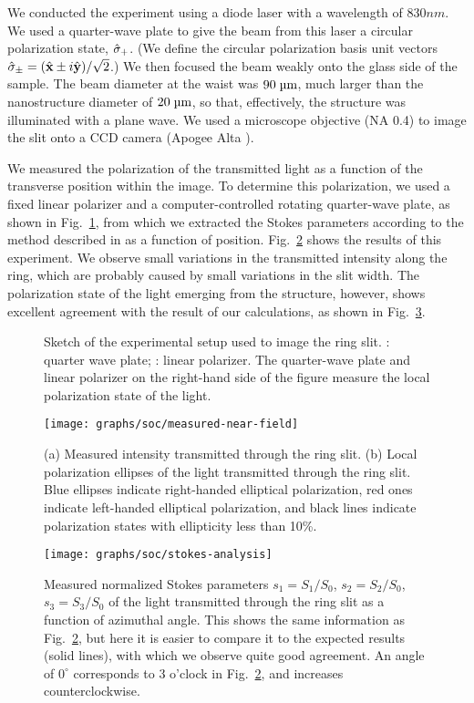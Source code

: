 We conducted the experiment using a diode laser with a wavelength of $830\unit{nm}$. We used a quarter-wave plate to give the beam from this laser a circular polarization state, $\hat{\mathbf{\sigma}}_{+}$. (We define the circular polarization basis unit vectors $\hat{\mathbf{\sigma}}_{\pm } = (\hat{\mathbf{x}} \pm  i\hat{\mathbf{y}})/\sqrt {2}$.) We then focused the beam weakly onto the glass side of the sample. The beam diameter at the waist was $90\micron$, much larger than the nanostructure diameter of $20\micron$, so that, effectively, the structure was illuminated with a plane wave. We used a microscope objective (\gls{NA} 0.4) to image the slit onto a \gls{CCD} camera (Apogee Alta ).

We measured the polarization of the transmitted light as a function of the transverse position within the image. To determine this polarization, we used a fixed linear polarizer and a computer-controlled rotating quarter-wave plate, as shown in Fig.~\ref{setup}, from which we extracted the Stokes parameters according to the method described in \textcite{Schaefer2007} as a function of position. Fig.~\ref{near-field-measurements} shows the results of this experiment. We observe small variations in the transmitted intensity along the ring, which are probably caused by small variations in the slit width. The polarization state of the light emerging from the structure, however, shows excellent agreement with the result of our calculations, as shown in Fig.~\ref{soc:fig:stokes-analysis}.
%
\begin{figure}[tb]
  \caption{Sketch of the experimental setup used to image the ring slit. : quarter wave plate; : linear polarizer. The quarter-wave plate and linear polarizer on the right-hand side of the figure measure the local polarization state of the light.}
  \label{setup}
\end{figure}
%
\begin{figure}[b]
  \centering
  \texttt{[image: graphs/soc/measured-near-field]}
  \caption{(a) Measured intensity transmitted through the ring slit. (b) Local polarization ellipses of the light transmitted through the ring slit. Blue ellipses indicate right-handed elliptical polarization, red ones indicate left-handed elliptical polarization, and black lines indicate polarization states with ellipticity less than 10\%.}
  \label{near-field-measurements}
\end{figure}
%
\begin{figure}[tb]
  \forceversofloat\centering
  \texttt{[image: graphs/soc/stokes-analysis]}
  \caption{Measured normalized Stokes parameters $s_1=S_{1}/S_{0}$, $s_2=S_{2}/S_{0}$, $s_3=S_{3}/S_{0}$ of the light transmitted through the ring slit as a function of azimuthal angle. This shows the same information as Fig.~\ref{near-field-measurements}, but here it is easier to compare it to the expected results (solid lines), with which we observe quite good agreement.
  An angle of $0^\circ$ corresponds to 3 o'clock in Fig.~\ref{near-field-measurements}, and increases counterclockwise.}
  \label{soc:fig:stokes-analysis}
\end{figure}

